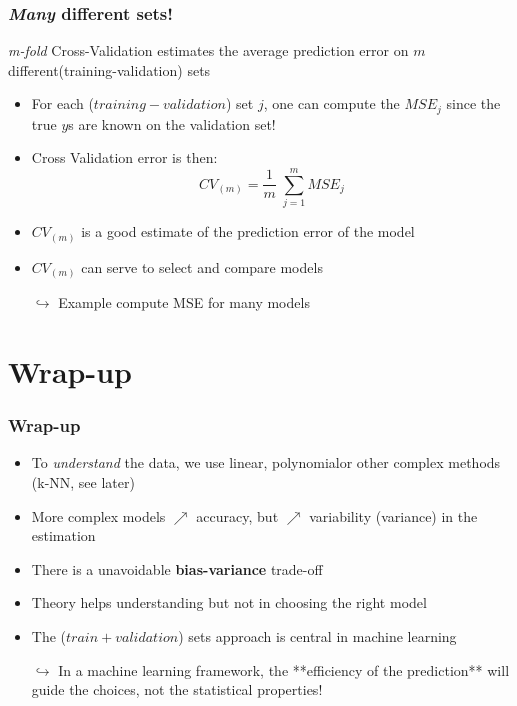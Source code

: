 \documentclass[xcolor=x11names,compress, aspectratio=169]{beamer}
\renewcommand{\(}{\begin{columns}}
\renewcommand{\)}{\end{columns}}
\newcommand{\<}[1]{\begin{column}{#1}}
\renewcommand{\>}{\end{column}}
\begin{document}
\begin{frame}
\frametitle{\textcolor{brique}{\textit{Many} different sets!  }}
\textit{m-fold} Cross-Validation estimates the average prediction error on $m$ different(training-validation) sets
\pause
\begin{itemize}[<+->]
\item For each ($training-validation$) set $j$, one can compute the $MSE_j$ since the true $y$s are known on the validation set!
\item Cross Validation error is then:
 $$ CV_{(m)}  =  \frac{1}{m} \; \sum_ {j=1}^m   MSE_j$$
 \item $CV_{(m)}$ is a good estimate of the prediction error of the model
 \item  $CV_{(m)} $  can serve to select and compare models
 \item[$\hookrightarrow$] Example compute MSE for many models
\end{itemize}
\end{frame}


\section{Wrap-up}

\begin{frame}
\frametitle{\textcolor{brique}{ Wrap-up }}
\pause
\begin{itemize}[<+->]
\item To \textit{understand }the data, we use linear, polynomialor other complex methods (k-NN, see later)
\item More complex models $\nearrow$ accuracy, but $\nearrow$ variability (variance) in the estimation
\item  There is a unavoidable  \textbf{bias-variance} trade-off
\item Theory helps understanding but not in choosing the right model
\item The ($train + validation$) sets approach is central in machine learning%
\item[$\hookrightarrow$] In a machine learning framework, the **efficiency of the prediction** will guide the choices, not the statistical properties! %
\end{itemize}
\end{frame}
\end{document}
